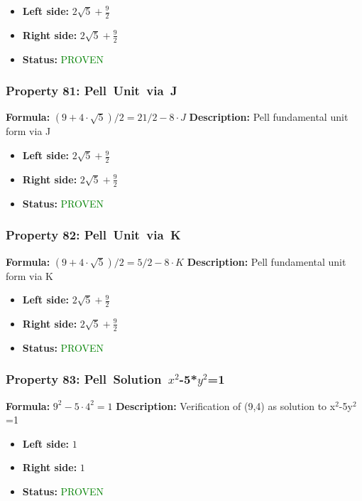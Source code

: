 \begin{itemize}
\item \textbf{Left side:} $2 \sqrt{5} + \frac{9}{2}$
\item \textbf{Right side:} $2 \sqrt{5} + \frac{9}{2}$
\item \textbf{Status:} \textcolor{green}{PROVEN}
\end{itemize}

\subsubsection*{Property 81: Pell~Unit~via~J}
\textbf{Formula:} $(9+4 \cdot \sqrt{5})/2 = 21/2 - 8 \cdot J$
\textbf{Description:} Pell fundamental unit form via J

\begin{itemize}
\item \textbf{Left side:} $2 \sqrt{5} + \frac{9}{2}$
\item \textbf{Right side:} $2 \sqrt{5} + \frac{9}{2}$
\item \textbf{Status:} \textcolor{green}{PROVEN}
\end{itemize}

\subsubsection*{Property 82: Pell~Unit~via~K}
\textbf{Formula:} $(9+4 \cdot \sqrt{5})/2 = 5/2 - 8 \cdot K$
\textbf{Description:} Pell fundamental unit form via K

\begin{itemize}
\item \textbf{Left side:} $2 \sqrt{5} + \frac{9}{2}$
\item \textbf{Right side:} $2 \sqrt{5} + \frac{9}{2}$
\item \textbf{Status:} \textcolor{green}{PROVEN}
\end{itemize}

\subsubsection*{Property 83: Pell~Solution~$x^{2}$-5*$y^{2}$=1}
\textbf{Formula:} $9^2 - 5 \cdot 4^2 = 1$
\textbf{Description:} Verification of (9,4) as solution to x$^2$-5y$^2$=1

\begin{itemize}
\item \textbf{Left side:} $1$
\item \textbf{Right side:} $1$
\item \textbf{Status:} \textcolor{green}{PROVEN}
\end{itemize}

